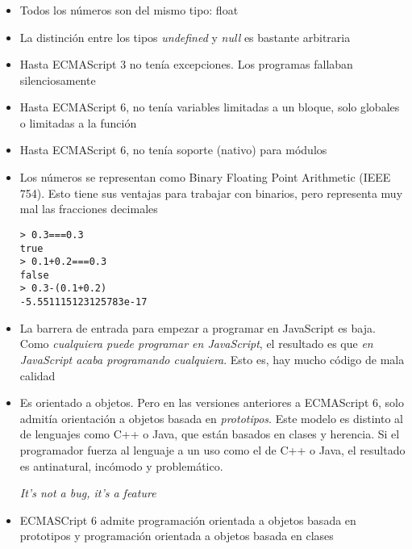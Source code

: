 \documentclass[ucs]{beamer}
\begin{document}
\begin{frame}[fragile]
\frametitle{}
\begin{itemize}
\item
Todos los números son del mismo tipo: float

\item
La distinción entre los tipos \emph{undefined} y
\emph{null} es bastante arbitraria

\item
Hasta ECMAScript 3 no tenía excepciones. Los programas fallaban silenciosamente

\item
Hasta ECMAScript 6, no tenía variables limitadas a un bloque, solo globales o limitadas a la función

\item
Hasta ECMAScript 6, no tenía soporte (nativo) para módulos

\item
Los números se representan como
Binary Floating Point Arithmetic (IEEE 754).
Esto tiene sus ventajas para trabajar con binarios, pero representa muy
mal las fracciones decimales

  \begin{scriptsize}
  \begin{verbatim}
> 0.3===0.3
true
> 0.1+0.2===0.3
false
> 0.3-(0.1+0.2)
-5.551115123125783e-17
  \end{verbatim}
  \end{scriptsize}

\end{itemize}

\end{frame}


\begin{frame}[fragile]

\begin{itemize}
\item
La barrera de entrada para empezar a programar en JavaScript es baja.
Como \emph{cualquiera puede programar en JavaScript}, el resultado es
que \emph{en JavaScript acaba programando cualquiera}. Esto es, hay
mucho código de mala calidad

\item
Es orientado a objetos. Pero en las versiones anteriores a 
ECMAScript 6, solo admitía orientación a objetos basada
en 
 \emph{prototipos}. Este modelo es distinto al de lenguajes
 como C++ o Java, que están basados en clases y herencia.
Si el programador fuerza al lenguaje a un uso como el de C++ o Java,
el resultado es antinatural, incómodo y problemático.

\emph{It's not a bug, it's a feature}

\item
ECMASCript 6 admite programación orientada a objetos basada en prototipos
y programación orientada a objetos basada en clases

\end{itemize}

\end{frame}
\end{document}
